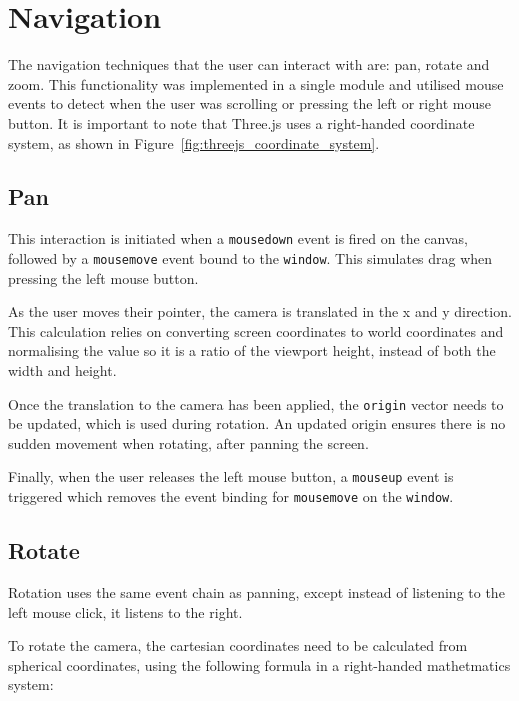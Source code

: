 \section{Navigation} {
\label{sec:navigation}

	The navigation techniques that the user can interact with are: pan, rotate and zoom. This functionality was implemented in a single module and utilised mouse events to detect when the user was scrolling or pressing the left or right mouse button. It is important to note that Three.js uses a right-handed coordinate system, as shown in Figure~\ref{fig:threejs_coordinate_system}.

	

	\subsection{Pan} {
	\label{sec:pan}

		This interaction is initiated when a \texttt{mousedown} event is fired on the canvas, followed by a \texttt{mousemove} event bound to the \texttt{window}. This simulates drag when pressing the left mouse button.

		As the user moves their pointer, the camera is translated in the x and y direction. This calculation relies on converting screen coordinates to world coordinates and normalising the value so it is a ratio of the viewport height, instead of both the width and height.

		Once the translation to the camera has been applied, the \texttt{origin} vector needs to be updated, which is used during rotation. An updated origin ensures there is no sudden movement when rotating, after panning the screen.

		Finally, when the user releases the left mouse button, a \texttt{mouseup} event is triggered which removes the event binding for \texttt{mousemove} on the \texttt{window}. 

	}

	\subsection{Rotate} {
	\label{sec:rotate}

		Rotation uses the same event chain as panning, except instead of listening to the left mouse click, it listens to the right.

		To rotate the camera, the cartesian coordinates need to be calculated from spherical coordinates, using the following formula in a right-handed mathetmatics system:

}}
